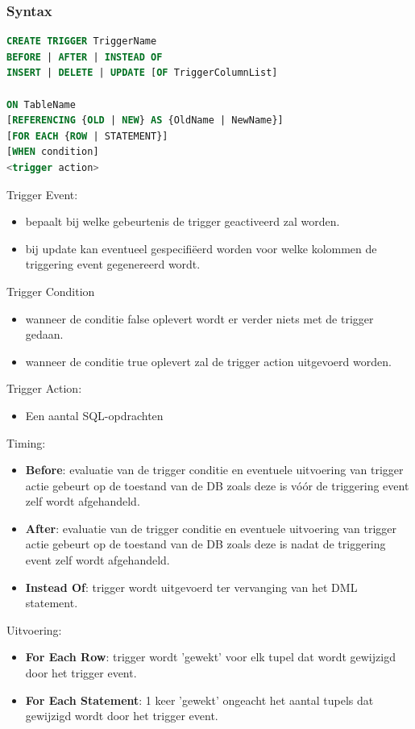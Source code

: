 \documentclass[a4paper,12pt]{article}
\begin{document}
\subsubsection{Syntax}
\begin{lstlisting}[language=sql, breaklines=true]
CREATE TRIGGER TriggerName
BEFORE | AFTER | INSTEAD OF
INSERT | DELETE | UPDATE [OF TriggerColumnList]

ON TableName
[REFERENCING {OLD | NEW} AS {OldName | NewName}]
[FOR EACH {ROW | STATEMENT}]
[WHEN condition]
<trigger action>
\end{lstlisting}

Trigger Event:
\begin{itemize}
\item bepaalt bij welke gebeurtenis de trigger geactiveerd zal worden.
\item bij update kan eventueel gespecifiëerd worden voor welke kolommen de triggering event gegenereerd wordt.
\end{itemize}

Trigger Condition
\begin{itemize}
\item wanneer de conditie false oplevert wordt er verder niets met de trigger gedaan.
\item wanneer de conditie true oplevert zal de trigger action uitgevoerd worden.
\end{itemize}

Trigger Action:
\begin{itemize}
\item Een aantal SQL-opdrachten
\end{itemize}

Timing:
\begin{itemize}
\item \textbf{Before}: evaluatie van de trigger conditie en eventuele uitvoering van trigger actie gebeurt op de toestand van de DB zoals deze is vóór de triggering event zelf wordt afgehandeld.
\item \textbf{After}: evaluatie van de trigger conditie en eventuele uitvoering van trigger actie gebeurt op de toestand van de DB zoals deze is nadat de triggering event zelf wordt afgehandeld.
\item \textbf{Instead Of}: trigger wordt uitgevoerd ter vervanging van het DML statement.
\end{itemize}

Uitvoering:
\begin{itemize}
\item \textbf{For Each Row}: trigger wordt 'gewekt' voor elk tupel dat wordt gewijzigd door het trigger event.
\item \textbf{For Each Statement}:   1 keer 'gewekt' ongeacht het aantal tupels dat gewijzigd wordt door het trigger event.
\end{itemize}
\end{document}
